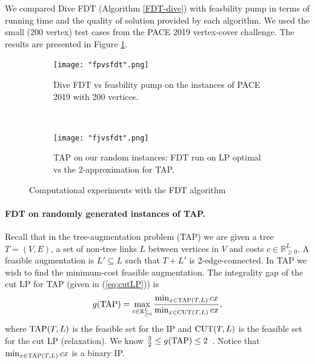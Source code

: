 We compared Dive FDT (Algorithm \ref{FDT-dive}) with feasbility pump \cite{fp1} in terms of running time
and the quality of solution provided by each algorithm. We used the small (200 vertex) test cases from the PACE 2019 vertex-cover challenge. The results are presented in Figure \ref{fpvsfdt}. 

\begin{figure}[h!]
\begin{subfigure}{.5\textwidth}
\centering
	\texttt{[image: "fpvsfdt".png]}
	\caption{Dive FDT vs feasbility pump on the instances of PACE 2019 \cite{PACE} with 200 vertices.}
	\label{fpvsfdt}
	\end{subfigure}
	$\quad\;$
	\begin{subfigure}{.5\textwidth}
	\centering
	\texttt{[image: "fjvsfdt".png]}
	\caption{TAP on our random instances: FDT run on LP optimal vs the 2-approximation for TAP\cite{FJ81}.}
	\label{fjvsfdt}
	\end{subfigure}
	\caption{Computational experiments with the FDT algorithm}
	\label{fdtcomp}
\end{figure}
\paragraph{FDT on randomly generated instances of TAP.}
Recall that in the tree-augmentation problem (TAP) we are given a tree $T=(V,E)$, a set of non-tree links $L$ between vertices in $V$ and costs $c\in \mathbb{R}^{L}_{\geq 0}$. A feasible augmentation is $L'\subseteq L$ such that $T+L'$ is 2-edge-connected. In TAP we wish to find the minimum-cost feasible augmentation. The integrality gap of the cut LP for TAP (given in (\ref{eq:cutLP})) is
\begin{equation*}
g(\operatorname{{{TAP}}}) = \max_{c\in \mathbb{R}^L_{\geq 0}} \frac{\min_{x\in\operatorname{{{TAP}}}(T,L)} cx}{\min_{x\in\operatorname{{{CUT}}}(T,L)} cx},
\end{equation*}  
where $\operatorname{{{TAP}}}(T,L)$ is the feasible set for the IP and $\operatorname{{{CUT}}}(T,L)$ is the feasible set for the cut LP (relaxation).
We know $\frac{3}{2}\leq g(\operatorname{{{TAP}}})\leq 2$~\cite{FJ81,32gaptap}. Notice that $\min_{x\in \operatorname{{{TAP}}}(T,L)}cx$ is a binary IP. 

